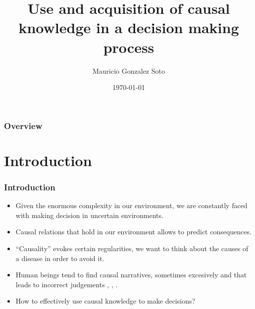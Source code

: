 \documentclass{beamer}
\title[Short title]{Use and acquisition of causal knowledge in a decision making process} %
\author{Mauricio Gonzalez Soto} %
\institute[INAOE] %
{
Instituto Nacional de Astrofísica Óptica y Electrónica \\ %
\medskip
\textit{mauricio@inaoep.mx} %
}
\date{\today} %
\theoremstyle{plain}
\begin{document}
\begin{frame}
\titlepage %
\end{frame}

\begin{frame}[allowframebreaks]
\frametitle{Overview} %
\tableofcontents %
\end{frame}


\section{Introduction} 
\begin{frame}
\frametitle{Introduction}
\begin{itemize}
\item Given the enormous complexity in our environment, we are constantly faced with making decision in uncertain environments.
\item Causal relations that hold in our environment allows to predict consequences.
\item “Causality” evokes certain regularities, we want to think about the causes of a disease in order to avoid it. 
\item Human beings tend to find causal narratives, sometimes excesively and that leads to incorrect judgements \cite{tversky1977causal}, \cite{tversky1980causal}, \cite{kahneman2011thinking}.
\item How to effectively use causal knowledge to make decisions?
\end{itemize}
\end{frame}
\end{document}
